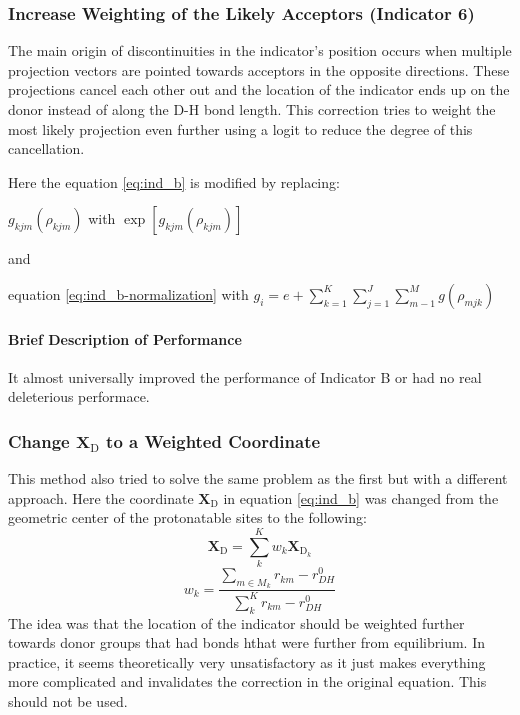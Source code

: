 \documentclass{article}
\newcommand{\mb}[1]{\mathbf{#1}}
\newcommand{\mr}[1]{\mathrm{#1}}
\begin{document}
\subsubsection{Increase Weighting of the Likely Acceptors (Indicator 6)}\label{ss:indicator6}
The main origin of discontinuities in the indicator's position occurs when multiple projection vectors are pointed towards acceptors in the opposite directions.
These projections cancel each other out and the location of the indicator ends up on the donor instead of along the D-H bond length.
This correction tries to weight the most likely projection even further using a logit to reduce the degree of this cancellation.

Here the equation \ref{eq:ind_b} is modified by replacing:

\begin{center}
$g_{kjm}(\rho_{kjm})$ with $\exp \left[ g_{kjm}(\rho_{kjm}) \right]$

and

equation \ref{eq:ind_b-normalization} with $g_i = e + \sum^K_{k=1} \sum^J_{j=1}   \sum^M_{m-1} g(\rho_{mjk})$
\end{center}

\paragraph{Brief Description of Performance}
It almost universally improved the performance of Indicator B or had no real deleterious performace.

\subsubsection{Change $\mb{X}_{\mr{D}}$ to a Weighted Coordinate}\label{ss:indicator9}
This method also tried to solve the same problem as the first but with a different approach.
Here the coordinate $\mb{X}_{\mr{D}}$ in equation \ref{eq:ind_b} was changed from the geometric center of the protonatable sites to the following:
\begin{equation}
\mb{X}_{\mr{D}} = \sum_k^K w_k \mb{X}_{\mr{D}_k}
\end{equation}
\begin{equation}
w_k = \frac{\sum_{m \in M_k} r_{km} - r^0_{DH} }{\sum_k^K r_{km} - r^0_{DH}}
\end{equation}
The idea was that the location of the indicator should be weighted further towards donor groups that had bonds hthat were further from equilibrium.
In practice, it seems theoretically very unsatisfactory as it just makes everything more complicated and invalidates the correction in the original equation.
This should not be used.
\end{document}
